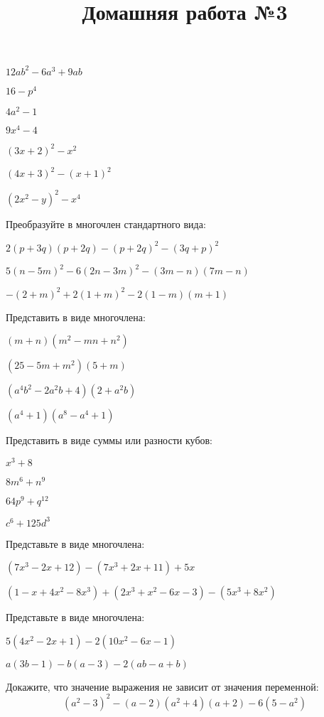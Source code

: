 \begin{listofex}
\begin{enumcols}[itemcolumns=3]
		\item \( 12ab^2-6a^3+9ab \)
		\item \( 16-p^4 \)
		\item \( 4a^2-1 \)
		\item \( 9x^4-4 \)
		\item \( (3x+2)^2-x^2 \)
		\item \( (4x+3)^2-(x+1)^2 \)
		\item \( (2x^2-y)^2-x^4 \)
	\end{enumcols}
	\item Преобразуйте в многочлен стандартного вида:
	\begin{enumcols}[itemcolumns=1]
		\item \( 2(p+3q)(p+2q)-(p+2q)^2-(3q+p)^2 \)
		\item \( 5(n-5m)^2-6(2n-3m)^2-(3m-n)(7m-n) \)
		\item \( -(2+m)^2+2(1+m)^2-2(1-m)(m+1) \)
	\end{enumcols}
	\item Представить в виде многочлена:
	\begin{enumcols}[itemcolumns=2]
		\item \( (m+n)(m^2-mn+n^2) \)
		\item \( (25-5m+m^2)(5+m) \)
		\item \( (a^4b^2-2a^2b+4)(2+a^2b) \)
		\item \( (a^4+1)(a^8-a^4+1) \)
	\end{enumcols}
	\item Представить в виде суммы или разности кубов:
	\begin{enumcols}[itemcolumns=4]
		\item \( x^3+8 \)
		\item \( 8m^6+n^9 \)
		\item \( 64p^9+q^{12} \)
		\item \( c^6+125d^3 \)
	\end{enumcols}
\end{listofex}
%	
\newpage
\title{Домашняя работа №3}
\begin{listofex}
	\item Представьте в виде многочлена:
	\begin{enumcols}[itemcolumns=1]
		\item \( (7x^3-2x+12)-(7x^3+2x+11)+5x \)
		\item \( (1-x+4x^2-8x^3)+(2x^3+x^2-6x-3)-(5x^3+8x^2) \)
	\end{enumcols}
	\item Представьте в виде многочлена:
	\begin{enumcols}[itemcolumns=1]
		\item \( 5(4x^2-2x+1)-2(10x^2-6x-1) \)
		\item \( a(3b-1)-b(a-3)-2(ab-a+b) \)
	\end{enumcols}
	\item Докажите, что значение выражения не зависит от значения переменной:
	\[ (a^2-3)^2-(a-2)(a^2+4)(a+2)-6(5-a^2) \]
\end{listofex}
